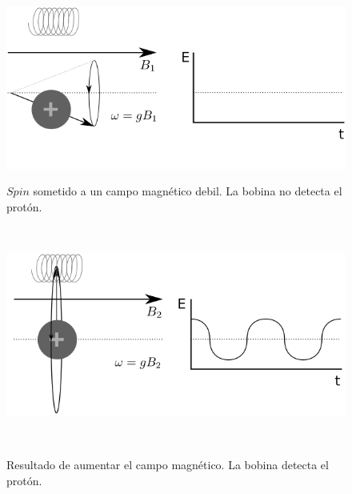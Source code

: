 \begin{figure}[h!]

\begin{minipage}[b]{0.49\textwidth}
    \includegraphics[width=\textwidth]{img/spin0.png}
    \caption{$Spin$ sometido a un campo magn\'etico debil. La bobina no
             detecta el prot\'on.}
    \label{fig:nosignal}
\end{minipage} ~ %
\hfill
\begin{minipage}[b]{0.49\textwidth}
    \includegraphics[width=\textwidth]{img/spin1.png}
    \caption{Resultado de aumentar el campo magn\'etico. La bobina 
             detecta el prot\'on.}
    \label{fig:signal}    
\end{minipage} ~ %

\end{figure}

